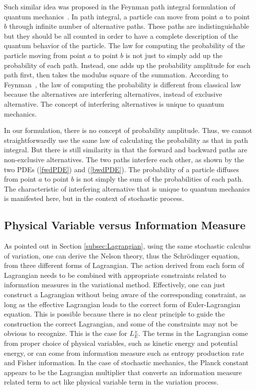 \documentclass[%
 aip, 
 amsmath,amssymb,amsthm,
 nofootinbib,
 reprint,
]{revtex4-1}
\begin{document}
Such similar idea was proposed in the Feynman path integral formulation of quantum mechanics~\cite{Feynman48}. In path integral, a particle can move from point $a$ to point $b$ through infinite number of alternative paths. These paths are indistinguishable but they should be all counted in order to have a complete description of the quantum behavior of the particle. The law for computing the probability of the particle moving from point $a$ to point $b$ is not just to simply add up the probability of each path. Instead, one adds up the probability amplitude for each path first, then takes the modulus square of the summation. According to Feynman~\cite{Feynman48, Feynman05}, the law of computing the probability is different from classical law because the alternatives are interfering alternatives, instead of exclusive alternative. The concept of interfering alternatives is unique to quantum mechanics.

In our formulation, there is no concept of probability amplitude. Thus, we cannot straightforwardly use the same law of calculating the probability as that in path integral. But there is still similarity in that the forward and backward paths are non-exclusive alternatives. The two paths interfere each other, as shown by the two PDEs (\ref{fwdPDE}) and (\ref{bwdPDE}). The probability of a particle diffuses from point $a$ to point $b$ is not simply the sum of the probabilities of each path. The characteristic of interfering alternative that is unique to quantum mechanics is manifested here, but in the context of stochastic process.

\subsection{Physical Variable versus Information Measure}
As pointed out in Section \ref{subsec:Lagrangian}, using the same stochastic calculus of variation, one can derive the Nelson theory, thus the Schr\"{o}dinger equation, from three different forms of Lagrangian. The action derived from each form of Lagrangian needs to be combined with appropriate constraints related to information measures in the variational method. Effectively, one can just construct a Lagrangian without being aware of the corresponding constraint, as long as the effective Lagrangian leads to the correct form of Euler-Lagrangian equation. This is possible because there is no clear principle to guide the construction the correct Lagrangian, and some of the constraints may not be obvious to recognize. This is the case for $L_E^{\pm}$. The terms in the Lagrangian come from proper choice of physical variables, such as kinetic energy and potential energy, or can come from information measure such as entropy production rate and Fisher information. In the case of stochastic mechanics, the Planck constant appears to be the Lagrangian multiplier that converts an information measure related term to act like physical variable term in the variation process. 
\end{document}
